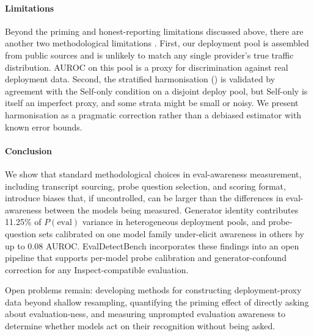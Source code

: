 \documentclass{article}
\begin{document}
\paragraph{Limitations}
Beyond the priming and honest-reporting limitations discussed above, there are another two methodological limitations . First, our
deployment pool is assembled from public sources and is
unlikely to match any single provider's true traffic distribution. AUROC on this pool is a proxy for discrimination against real deployment data. Second, the stratified
harmonisation () is validated by agreement
with the Self-only condition on a disjoint deploy pool, but Self-only is itself an imperfect
proxy, and some strata might be small or noisy. We present harmonisation
as a pragmatic correction rather than a debiased estimator with known error bounds.

\paragraph{Conclusion}
We show that standard methodological choices in eval-awareness
measurement, including transcript sourcing, probe question
selection, and scoring format, introduce biases that, if
uncontrolled, can be larger than the differences in eval-awareness
between the models being measured. Generator identity contributes
11.25\% of $P(\text{eval})$ variance in heterogeneous deployment
pools, and probe-question sets calibrated on one model family
under-elicit awareness in others by up to 0.08 AUROC.
EvalDetectBench incorporates these findings into an open pipeline
that supports per-model probe calibration and generator-confound
correction for any Inspect-compatible evaluation.

Open problems remain: developing methods for
constructing deployment-proxy data beyond shallow resampling,
quantifying the priming effect of directly asking about
evaluation-ness, and measuring unprompted evaluation awareness to determine whether models act on their recognition without being asked.


\newpage


\end{document}
